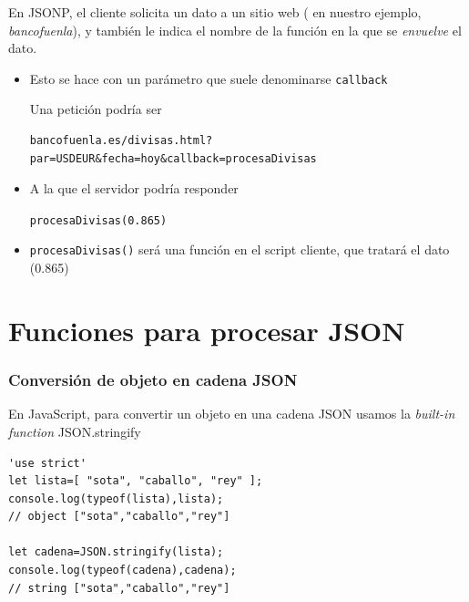 \documentclass[ucs]{beamer}
\begin{document}
\begin{frame}[fragile]


En JSONP, el cliente solicita un dato a un sitio web
( en nuestro ejemplo, \emph{bancofuenla}), y también
le indica el nombre de la función en la que se \emph{envuelve} el dato.

\begin{itemize}
    \item
Esto se hace con un parámetro que suele denominarse  \verb|callback|

Una petición podría ser


  \begin{scriptsize}
  \begin{verbatim}
bancofuenla.es/divisas.html?par=USDEUR&fecha=hoy&callback=procesaDivisas
  \end{verbatim}
  \end{scriptsize}

    \item
A la que el servidor podría responder

\verb|procesaDivisas(0.865)|

    \item
\verb|procesaDivisas()|
será una función en el script cliente, que tratará el dato (0.865)

\end{itemize}

\end{frame}





\section{Funciones para procesar JSON}
\begin{frame}[fragile]
\frametitle{Conversión de objeto en cadena JSON}
En JavaScript,
para convertir un objeto en una cadena JSON
usamos la \emph{built-in function} JSON.stringify

  \begin{scriptsize}
  \begin{verbatim}
'use strict'
let lista=[ "sota", "caballo", "rey" ];
console.log(typeof(lista),lista);
// object ["sota","caballo","rey"]

let cadena=JSON.stringify(lista);
console.log(typeof(cadena),cadena);
// string ["sota","caballo","rey"]
  \end{verbatim}
  \end{scriptsize}

\end{frame}
\end{document}
